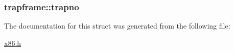 \subsubsection[{\texorpdfstring{trapno}{trapno}}]{ trapframe\+::trapno}\hypertarget{structtrapframe_abc7f81b0a6a91d13e9fefe171b0a7d12}{}\label{structtrapframe_abc7f81b0a6a91d13e9fefe171b0a7d12}


The documentation for this struct was generated from the following file\+:\begin{DoxyCompactItemize}
\item 
\hyperlink{x86_8h}{x86.\+h}\end{DoxyCompactItemize}
